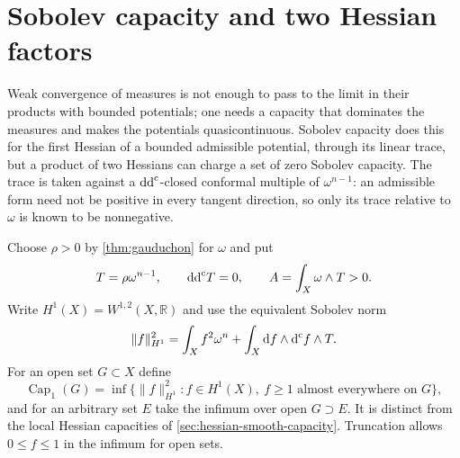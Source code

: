 \section{Sobolev capacity and two Hessian factors}
\label{sec:hessian-sobolev-two-factors}

Weak convergence of measures is not enough to pass to the limit in
their products with bounded potentials; one needs a capacity that
dominates the measures and makes the potentials quasicontinuous.
Sobolev capacity does this for the first Hessian of a bounded
admissible potential, through its linear trace, but a product of two
Hessians can charge a set of zero Sobolev capacity. The trace is taken
against a $\mathrm{dd}^{\mathrm{c}}$-closed conformal multiple of $\omega^{n-1}$: an
admissible form need not be positive in every tangent direction, so
only its trace relative to $\omega$ is known to be nonnegative.

Choose $\rho>0$ by \cref{thm:gauduchon} for $\omega$ and put
\[
 T=\rho\omega^{n-1},\qquad \mathrm{dd}^{\mathrm{c}} T=0,\qquad
 A=\int_X\omega\wedge T>0.
\]
Write $H^1(X)=W^{1,2}(X,\mathbb R)$ and use the equivalent Sobolev norm
\[
 \|f\|_{H^1}^2=\int_Xf^2\omega^n+
                   \int_X\mathrm df\wedge\mathrm d^{\mathrm c} f\wedge T.
\]
For an open set $G\subset X$ define
\[
 \operatorname{Cap}_1(G)
 =\inf\{\|f\|_{H^1}^2:f\in H^1(X),\ f\geq1
                          \text{ almost everywhere on }G\},
\]
and for an arbitrary set $E$ take the infimum over open $G\supset E$.
It is distinct from the local Hessian capacities of
\cref{sec:hessian-smooth-capacity}. Truncation allows $0\leq f\leq1$ in the infimum for open sets.

